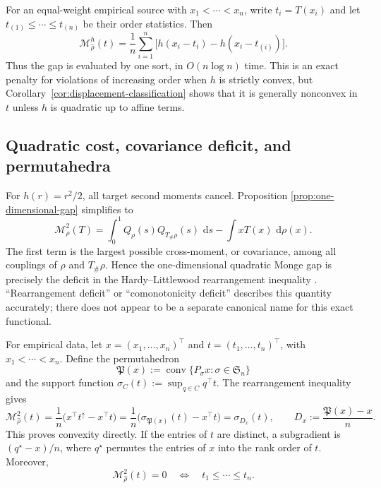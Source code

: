 \documentclass[11pt,a4paper]{article}
\theoremstyle{definition}
\theoremstyle{remark}
\newcommand{\Mcal}{\mathcal M}
\newcommand{\conv}{\operatorname{conv}}
\newcommand{\dd}{\,\mathrm d}
\newcommand{\Perm}{\mathfrak P}
\begin{document}
For an equal-weight empirical source with
$x_1<\cdots<x_n$, write $t_i=T(x_i)$ and let
$t_{(1)}\leq\cdots\leq t_{(n)}$ be their order statistics. Then
\begin{equation}\label{eq:empirical-general-h-gap}
  \Mcal_{\widehat\rho}^h(t)
  =\frac1n\sum_{i=1}^n
    \bigl[h(x_i-t_i)-h(x_i-t_{(i)})\bigr].
\end{equation}
Thus the gap is evaluated by one sort, in $O(n\log n)$ time. This is an exact
penalty for violations of increasing order when $h$ is strictly convex, but
Corollary~\ref{cor:displacement-classification} shows that it is generally
nonconvex in $t$ unless $h$ is quadratic up to affine terms.

\subsection{Quadratic cost, covariance deficit, and permutahedra}

For $h(r)=r^2/2$, all target second moments cancel. Proposition
\ref{prop:one-dimensional-gap} simplifies to
\begin{equation}\label{eq:quadratic-covariance-gap}
  \Mcal_\rho^2(T)
  =\int_0^1 Q_\rho(s)Q_{T_\#\rho}(s)\,\dd s
    -\int xT(x)\,\dd\rho(x).
\end{equation}
The first term is the largest possible cross-moment, or covariance, among all
couplings of $\rho$ and $T_\#\rho$. Hence the one-dimensional quadratic Monge
gap is precisely the deficit in the Hardy--Littlewood rearrangement inequality
\citep{HardyLittlewoodPolya1952}. ``Rearrangement deficit'' or
``comonotonicity deficit'' describes this quantity accurately; there does not
appear to be a separate canonical name for this exact functional.

For empirical data, let $x=(x_1,\ldots,x_n)^\top$ and
$t=(t_1,\ldots,t_n)^\top$, with $x_1<\cdots<x_n$. Define the permutahedron
\[
  \Perm(x):=\conv\{P_\sigma x:\sigma\in\mathfrak S_n\}
\]
and the support function $\sigma_C(t):=\sup_{q\in C}q^\top t$. The
rearrangement inequality gives
\begin{equation}\label{eq:permutahedron-gap}
  \Mcal_{\widehat\rho}^2(t)
  =\frac1n\bigl(x^\top t^\uparrow-x^\top t\bigr)
  =\frac1n\bigl(\sigma_{\Perm(x)}(t)-x^\top t\bigr)
  =\sigma_{D_x}(t),
  \qquad
  D_x:=\frac{\Perm(x)-x}{n}.
\end{equation}
This proves convexity directly. If the entries of $t$ are distinct, a
subgradient is $(q^\star-x)/n$, where $q^\star$ permutes the entries of $x$
into the rank order of $t$. Moreover,
\begin{equation}\label{eq:zero-monotone-cone}
  \Mcal_{\widehat\rho}^2(t)=0
  \quad\Longleftrightarrow\quad
  t_1\leq\cdots\leq t_n.
\end{equation}
\end{document}
